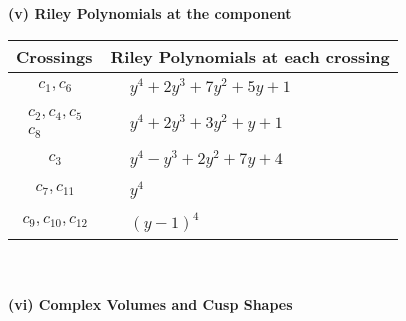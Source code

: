 \documentclass[1p]{elsarticle_modified}
\theoremstyle{definition}
\begin{document}
\newpage\renewcommand{\arraystretch}{1}
\flushleft \textbf{(v) Riley Polynomials at the component}\newline \\
\begin{tabular}{m{50pt}|m{274pt}}
Crossings & \hspace{64pt}Riley Polynomials at each crossing \\
\hline $$\begin{aligned}c_{1},c_{6}\end{aligned}$$&$\begin{aligned}
&y^4+2 y^3+7 y^2+5 y+1
\end{aligned}$\\
\hline $$\begin{aligned}c_{2},c_{4},c_{5}\\c_{8}\end{aligned}$$&$\begin{aligned}
&y^4+2 y^3+3 y^2+y+1
\end{aligned}$\\
\hline $$\begin{aligned}c_{3}\end{aligned}$$&$\begin{aligned}
&y^4- y^3+2 y^2+7 y+4
\end{aligned}$\\
\hline $$\begin{aligned}c_{7},c_{11}\end{aligned}$$&$\begin{aligned}
&y^4
\end{aligned}$\\
\hline $$\begin{aligned}c_{9},c_{10},c_{12}\end{aligned}$$&$\begin{aligned}
&(y-1)^4
\end{aligned}$\\
\hline
\end{tabular}\\~\\
\newpage\flushleft \textbf{(vi) Complex Volumes and Cusp Shapes}
\end{document}
